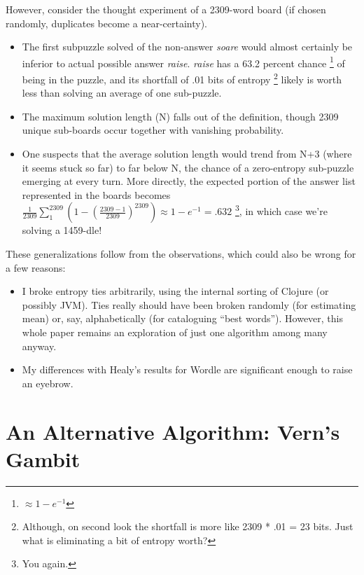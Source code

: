 \documentclass[11pt, oneside]{article} 	%
\begin{document}
However, consider the thought experiment of a 2309-word board (if chosen randomly, duplicates become a near-certainty).
\begin{itemize}
\item The first subpuzzle solved of the non-answer \emph{soare} would almost certainly be inferior to actual possible answer \emph{raise}. \emph{raise} has a 63.2 percent chance \footnote{$\approx 1- e^{-1}$} of being in the puzzle, and its shortfall of .01 bits of entropy \footnote{Although, on second look the shortfall is more like 2309 * .01 = 23 bits. Just what is eliminating a bit of entropy worth?} likely is worth less than solving an average of one sub-puzzle.
\item The maximum solution length (N) falls out of the definition, though 2309 unique sub-boards occur together with vanishing probability.
\item One suspects that the average solution length would trend from N+3 (where it seems stuck so far) to far below N, the chance of a zero-entropy sub-puzzle emerging at every turn. More directly, the expected portion of the answer list represented in the boards becomes $\frac{1}{2309} \sum_1^{2309} (1 - (\frac{2309 - 1}{2309})^{2309}) \approx 1 - e^{-1} = .632$ \footnote {You again.}, in which case we're solving a 1459-dle!
\end{itemize}

These generalizations follow from the observations, which could also be wrong for a few reasons:
\begin{itemize}
\item I broke entropy ties arbitrarily, using the internal sorting of Clojure (or possibly JVM). Ties really should have been broken randomly (for estimating mean) or, say, alphabetically (for cataloguing ``best words''). However, this whole paper remains an exploration of just one algorithm among many anyway.
\item My differences with Healy's \cite{1} results for Wordle are significant enough to raise an eyebrow. 
\end{itemize}

\section{An Alternative Algorithm: Vern's Gambit}
\end{document}
